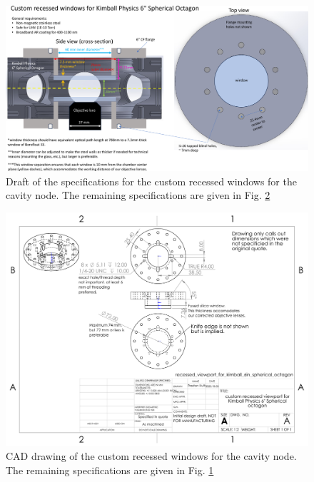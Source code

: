 \begin{figure}
    \centering
    \includegraphics[width=1\textwidth]{Images/recessed_window_draft.pdf}
    \caption{Draft of the specifications for the custom recessed windows for the cavity node. The remaining specifications are given in Fig. \ref{fig:recessedwindowdrawing}}
    \label{fig:recessedwindowdraft}
\end{figure}

\begin{figure}
    \centering
    \includegraphics[width=1\textwidth]{Images/recessed_viewport_for_kimball_6in_spherical_octagon.pdf}
    \caption{CAD drawing of the custom recessed windows for the cavity node. The remaining specifications are given in Fig. \ref{fig:recessedwindowdraft}}
    \label{fig:recessedwindowdrawing}
\end{figure}
